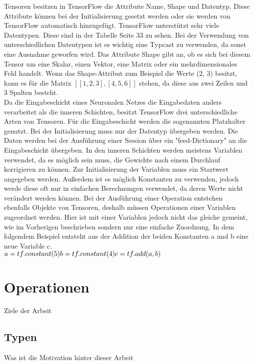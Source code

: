 Tensoren besitzen in TensorFlow die Attribute Name, Shape und Datentyp. Diese Attribute können bei der Initialisierung gesetzt werden oder sie werden von TensorFlow automatisch hinzugefügt. TensorFlow unterstützt sehr viele Datentypen. Diese sind in der Tabelle Seite 33 zu sehen. Bei der Verwendung von unterschiedlichen Datentypen ist es wichtig eine Typcast zu verwenden, da sonst eine Ausnahme geworfen wird. Das Attribute Shape gibt an, ob es sich bei diesem Tensor um eine Skalar, einen Vektor, eine Matrix oder ein mehrdimensionales Feld handelt. Wenn das Shape-Attribut zum Beispiel die Werte (2, 3) besitzt, kann es für die Matrix $\mathit{[[1, 2, 3], [4, 5, 6]]}$ stehen, da diese aus zwei Zeilen und 3 Spalten besteht.\\
Da die Eingabeschicht eines Neuronalen Netzes die Eingabedaten anders verarbeitet als die inneren Schichten, besitzt TensorFlow drei unterschiedliche Arten von Tensoren. Für die Eingabeschicht werden die sogenannten Platzhalter genutzt. Bei der Initialisierung muss nur der Datentyp übergeben werden. Die Daten werden bei der Ausführung einer Session über ein "feed-Dictionary"  an die Eingabeschicht übergeben. In den inneren Schichten werden meistens Variablen verwendet, da es möglich sein muss, die Gewichte nach einem Durchlauf korrigieren zu können. Zur Initialisierung der Variablen muss ein Startwert angegeben werden. Außerdem ist es möglich Konstanten zu verwenden, jedoch werde diese oft nur in einfachen Berechnungen verwendet, da deren Werte nicht verändert werden können.
Bei der Ausführung einer Operation entstehen ebenfalls Objekte von Tensoren, deshalb müssen Operationen einer Variablen zugeordnet werden. Hier ist mit einer Variablen jedoch nicht das gleiche gemeint, wie im Vorherigen beschrieben sondern nur eine einfache Zuordnung. In dem folgendem Beispiel entsteht aus der Addition der beiden Konstanten a und b eine neue Variable c.\\
\begin{math}
a = tf.constant(5)\\ b = tf.constant(4)\\ c = tf.add(a, b)    
\end{math}

\section{Operationen}
\label{sec:operationen}
\printsubchapterauthor{\authorMarco}
Ziele der Arbeit

\subsection{Typen}
\label{sec:typen}
Was ist die Motivation hinter dieser Arbeit

